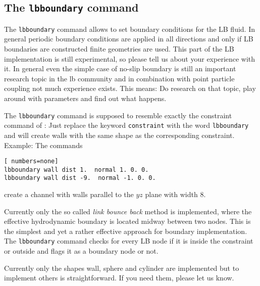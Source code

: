 \subsection*{The {\tt lbboundary} command}
The {\tt lbboundary} command allows to set boundary conditions for the LB fluid. In general
periodic boundary conditions are applied in all directions and only if LB boundaries
are constructed finite geometries are used. This part of the LB implementation is still experimental,
so please tell us about your experience with it. In general even the simple case of no-slip
boundary is still an important research topic in the lb community and in combination with
point particle coupling not much experience exists. This means: Do research on that topic, play
around with parameters and find out what happens. 


The {\tt lbboundary} command is supposed to resemble exactly the constraint command of 
\ES{}: Just replace the keyword {\tt constraint} with the word {\tt lbboundary} 
and \ES{} will create walls with the same shape as the corresponding constraint. Example:
The commands
\begin{lstlisting}[ numbers=none]
lbboundary wall dist 1.  normal 1. 0. 0. 
lbboundary wall dist -9.  normal -1. 0. 0. 
\end{lstlisting}
create a channel with walls parallel to the $yz$ plane with width 8.

Currently only the so called \emph{link bounce back} method is implemented, where the effective
hydrodynamic boundary is located midway between two nodes. This is the simplest and yet a 
rather effective approach for boundary implementation. The {\tt lbboundary} command
checks for every LB node if it is inside the constraint or outside and flags it as a boundary
node or not. 

Currently only the shapes wall, sphere and cylinder are implemented but to implement others 
is straightforward. If you need them, please let us know.
